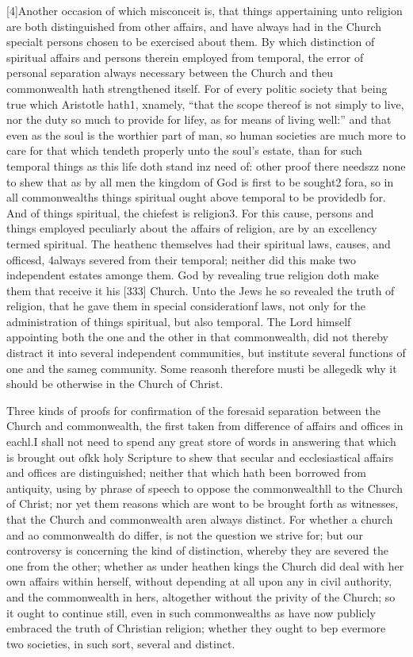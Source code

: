 [4]Another occasion of which misconceit is, that things appertaining unto religion are both distinguished from other affairs, and have always had in the Church specialt persons chosen to be exercised about them. By which distinction of spiritual affairs and persons therein employed from temporal, the error of personal separation always necessary between the Church and theu commonwealth hath strengthened itself. For of every politic society that being true which Aristotle hath1, xnamely, “that the scope thereof is not simply to live, nor the duty so much to provide for lifey, as for means of living well:” and that even as the soul is the worthier part of man, so human societies are much more to care for that which tendeth properly unto the soul’s estate, than for such temporal things as this life doth stand inz need of: other proof there needszz none to shew that as by all men the kingdom of God is first to be sought2 fora, so in all commonwealths things spiritual ought above temporal to be providedb for. And of things spiritual, the chiefest is religion3. For this cause, persons and things employed peculiarly about the affairs of religion, are by an excellency termed spiritual. The heathenc themselves had their spiritual laws, causes, and officesd, 4always severed from their temporal; neither did this make two independent estates amonge them. God by revealing true religion doth make them that receive it his [333] Church. Unto the Jews he so revealed the truth of religion, that he gave them in special considerationf laws, not only for the administration of things spiritual, but also temporal. The Lord himself appointing both the one and the other in that commonwealth, did not thereby distract it into several independent communities, but institute several functions of one and the sameg community. Some reasonh therefore musti be allegedk why it should be otherwise in the Church of Christ.

Three kinds of proofs for confirmation of the foresaid separation between the Church and commonwealth, the first taken from difference of affairs and offices in eachl.I shall not need to spend any great store of words in answering that which is brought out ofkk holy Scripture to shew that secular and ecclesiastical affairs and offices are distinguished; neither that which hath been borrowed from antiquity, using by phrase of speech to oppose the commonwealthll to the Church of Christ; nor yet them reasons which are wont to be brought forth as witnesses, that the Church and commonwealth aren always distinct. For whether a church and ao commonwealth do differ, is not the question we strive for; but our controversy is concerning the kind of distinction, whereby they are severed the one from the other; whether as under heathen kings the Church did deal with her own affairs within herself, without depending at all upon any in civil authority, and the commonwealth in hers, altogether without the privity of the Church; so it ought to continue still, even in such commonwealths as have now publicly embraced the truth of Christian religion; whether they ought to bep evermore two societies, in such sort, several and distinct.

